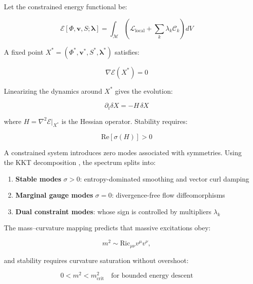 \documentclass[11pt,a4paper]{article}
\begin{document}
Let the constrained energy functional be:

\begin{equation}
\mathcal{E}[\Phi, \mathbf{v}, S; \boldsymbol{\lambda}]
= \int_{\mathcal{M}} \left(
\mathcal{L}_{\text{local}} + \sum_k \lambda_k \mathcal{C}_k \right) dV
\end{equation}

A fixed point \(X^* = (\Phi^*, \mathbf{v}^*, S^*, \boldsymbol{\lambda}^*)\) satisfies:

\begin{equation}
\nabla \mathcal{E}(X^*) = 0
\end{equation}

Linearizing the dynamics around \(X^*\) gives the evolution:

\begin{equation}
\partial_t \delta X = -H \, \delta X
\end{equation}

where \(H = \nabla^2 \mathcal{E}|_{X^*}\) is the Hessian operator. Stability requires:

\begin{equation}
\mathrm{Re}[\sigma(H)] > 0
\end{equation}

A constrained system introduces zero modes associated with symmetries. Using the KKT decomposition \citep{Boyd2004}, the spectrum splits into:

\begin{enumerate}
    \item \textbf{Stable modes} \( \sigma>0 \): entropy-dominated smoothing and vector curl damping
    \item \textbf{Marginal gauge modes} \( \sigma=0 \): divergence-free flow diffeomorphisms
    \item \textbf{Dual constraint modes}: whose sign is controlled by multipliers \(\lambda_k\)
\end{enumerate}

The mass–curvature mapping predicts that massive excitations obey:

\begin{equation}
m^2 \sim \mathrm{Ric}_{\mu\nu} v^\mu v^\nu,
\end{equation}

and stability requires curvature saturation without overshoot:

\begin{equation}
0 < m^2 < m_{\text{crit}}^2 \quad \text{for bounded energy descent}
\end{equation}
\end{document}
